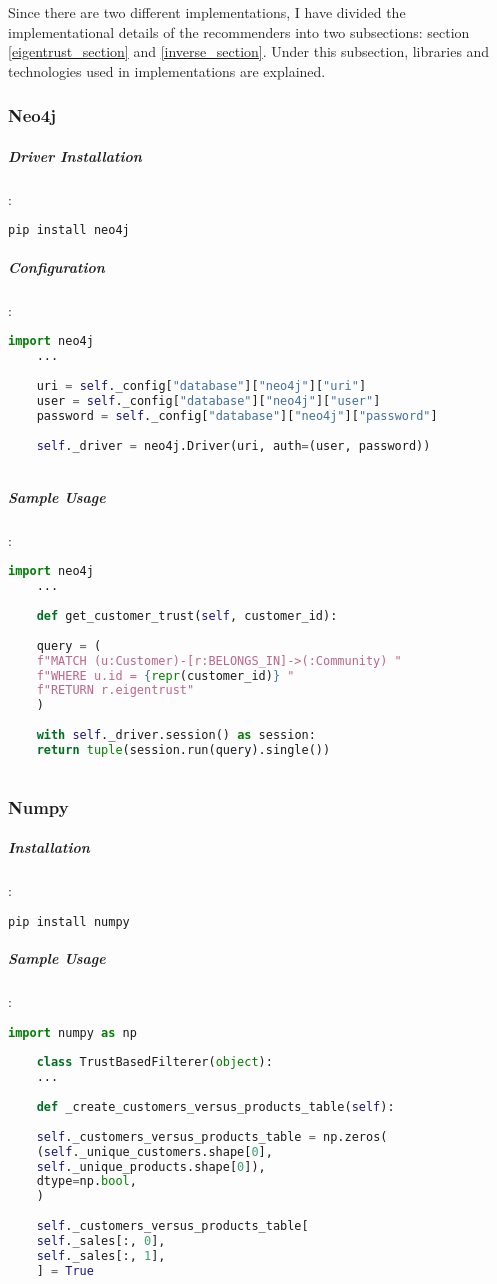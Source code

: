 	Since there are two different implementations, I have divided the implementational details of the recommenders into two subsections: section \ref{eigentrust_section} and \ref{inverse_section}. Under this subsection, libraries and technologies used in implementations are explained.
	\subsubsection{Neo4j}
	\subparagraph{Driver Installation}:
	\begin{lstlisting}[language=bash]
	pip install neo4j
	\end{lstlisting}
	
	\subparagraph{Configuration}:
	\begin{lstlisting}[language=python]
	import neo4j
	...
	
	uri = self._config["database"]["neo4j"]["uri"]
	user = self._config["database"]["neo4j"]["user"]
	password = self._config["database"]["neo4j"]["password"]
	
	self._driver = neo4j.Driver(uri, auth=(user, password))
	
	\end{lstlisting}
	
	\subparagraph{Sample Usage}:
	\begin{lstlisting}[language=python, caption=Neo4j driver example]
	import neo4j
	...
	
	def get_customer_trust(self, customer_id):
	
	query = (
	f"MATCH (u:Customer)-[r:BELONGS_IN]->(:Community) "
	f"WHERE u.id = {repr(customer_id)} "
	f"RETURN r.eigentrust"
	)
	
	with self._driver.session() as session:
	return tuple(session.run(query).single())
	
	\end{lstlisting}
	
	\subsubsection{Numpy}
	\subparagraph{Installation}:
	\begin{lstlisting}[language=bash]
	pip install numpy
	\end{lstlisting}
	
	\subparagraph{Sample Usage}:
	\begin{lstlisting}[language=python, caption=Numpy example]
	import numpy as np
	
	class TrustBasedFilterer(object):
	...
	
	def _create_customers_versus_products_table(self):
	
	self._customers_versus_products_table = np.zeros(
	(self._unique_customers.shape[0],
	self._unique_products.shape[0]),
	dtype=np.bool,
	)
	
	self._customers_versus_products_table[
	self._sales[:, 0],
	self._sales[:, 1],
	] = True
	\end{lstlisting}
	
